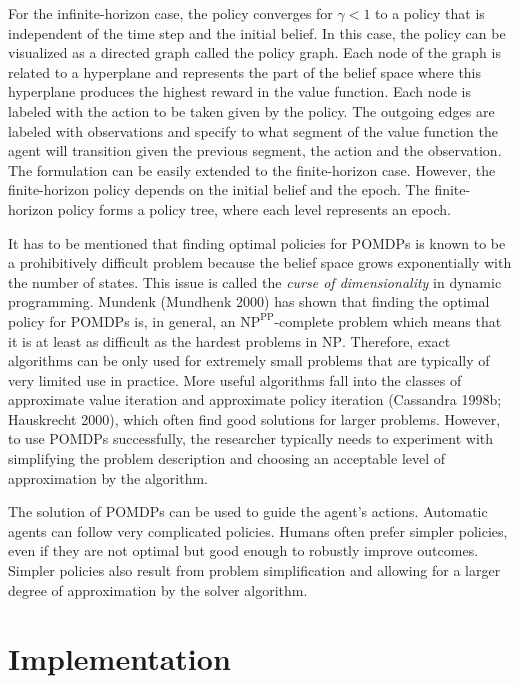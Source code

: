 For the infinite-horizon case, the policy converges for \(\gamma < 1\)
to a policy that is independent of the time step and the initial belief. In this case, the policy can be visualized as
a directed graph called the policy graph. Each node of the graph is related to a hyperplane and represents the part of the belief space
where this hyperplane produces the highest reward in the
value function. Each node is labeled with the action to be taken given by the policy.
The outgoing edges are labeled with observations and specify to what segment of the value function the agent will transition
given the previous segment, the action and the observation.
The formulation can be easily extended to the finite-horizon case. However, the finite-horizon policy depends on the initial belief and the epoch. The finite-horizon policy forms a policy tree, where each level represents an epoch.

It has to be mentioned that finding optimal policies for POMDPs is known to be
a prohibitively difficult problem because the belief space grows exponentially with the number of states.
This issue is called the \emph{curse of dimensionality} in dynamic programming.
Mundenk (Mundhenk 2000) has shown that finding the optimal policy for POMDPs is, in general, an
\(\text{NP}^\text{PP}\)-complete problem which means that it is at least as difficult as the hardest
problems in \(\text{NP}\).
Therefore, exact algorithms can be only used for extremely small problems that are typically
of very limited use in practice.
More useful algorithms fall into the classes of approximate value iteration and approximate policy iteration (Cassandra 1998b; Hauskrecht 2000), which often find good solutions for larger problems.
However, to use POMDPs successfully,
the researcher typically needs to experiment with simplifying the problem description
and choosing an acceptable level of approximation by the algorithm.

The solution of POMDPs can be used to guide the agent's actions. Automatic agents can follow very complicated
policies. Humans often prefer simpler policies, even if they are not optimal but good enough
to robustly improve outcomes. Simpler policies also result from problem simplification and allowing for a larger degree of approximation by the solver algorithm.

\hypertarget{implementation}{%
\section{Implementation}\label{implementation}}

